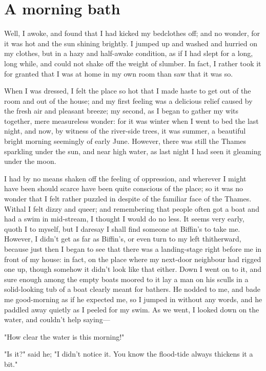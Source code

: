 \chapter{A morning bath}

Well, I awoke, and found that I had kicked my bedclothes off; and no
wonder, for it was hot and the sun shining brightly. I jumped up and
washed and hurried on my clothes, but in a hazy and half-awake
condition, as if I had slept for a long, long while, and could not shake
off the weight of slumber. In fact, I rather took it for granted that I
was at home in my own room than saw that it was so.

When I was dressed, I felt the place so hot that I made haste to get out
of the room and out of the house; and my first feeling was a delicious
relief caused by the fresh air and pleasant breeze; my second, as I
began to gather my wits together, mere measureless wonder: for it was
winter when I went to bed the last night, and now, by witness of the
river-side trees, it was summer, a beautiful bright morning seemingly of
early June. However, there was still the Thames sparkling under the sun,
and near high water, as last night I had seen it gleaming under the
moon.

I had by no means shaken off the feeling of oppression, and wherever I
might have been should scarce have been quite conscious of the place; so
it was no wonder that I felt rather puzzled in despite of the familiar
face of the Thames. Withal I felt dizzy and queer; and remembering that
people often got a boat and had a swim in mid-stream, I thought I would
do no less. It seems very early, quoth I to myself, but I daresay I
shall find someone at Biffin's to take me. However, I didn't get as far
as Biffin's, or even turn to my left thitherward, because just then I
began to see that there was a landing-stage right before me in front of
my house: in fact, on the place where my next-door neighbour had rigged
one up, though somehow it didn't look like that either. Down I went on
to it, and sure enough among the empty boats moored to it lay a man on
his sculls in a solid-looking tub of a boat clearly meant for bathers.
He nodded to me, and bade me good-morning as if he expected me, so I
jumped in without any words, and he paddled away quietly as I peeled for
my swim. As we went, I looked down on the water, and couldn't help
saying---

"How clear the water is this morning!"

"Is it?" said he; "I didn't notice it. You know the flood-tide always
thickens it a bit."

